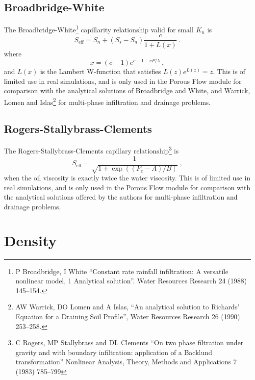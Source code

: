 \documentclass[12pt]{report}
\begin{document}
\subsection{Broadbridge-White}

The Broadbridge-White\footnote{P Broadbridge, I White ``Constant rate rainfall
infiltration: A versatile nonlinear model, 1 Analytical solution''.
Water Resources Research 24 (1988) 145--154.} capillarity relationship
valid for small $K_{n}$ is
\begin{equation}
S_{\mathrm{eff}} = S_{n} + (S_{s} - S_{n}) \frac{c}{1 + L(x)} \ .
\end{equation}
where
\begin{equation}
x = (c - 1) e^{c - 1 - c P/\lambda} \ ,
\end{equation}
and $L(x)$ is the Lambert W-function that satisfies $L(z)e^{L(z)}=z$.
This is of limited use in real simulations, and is only used in the Porous
Flow module for comparison with the analytical solutions of
Broadbridge and White, and Warrick, Lomen and Islas\footnote{AW
  Warrick, DO Lomen and A Islas, ``An analytical solution to Richards'
  Equation for a Draining Soil Profile'', Water Resources Research 26
  (1990) 253--258.} for multi-phase infiltration and drainage
problems.

\subsection{Rogers-Stallybrass-Clements}

The Rogers-Stallybrass-Clements capillary relationship\footnote{C
  Rogers, MP Stallybrass and DL Clements ``On two phase filtration
  under gravity and with boundary infiltration: application of a
  Backlund transformation'' Nonlinear Analysis, Theory, Methods and
  Applications 7 (1983) 785--799} is
\begin{equation}
S_{\mathrm{eff}} = \frac{1}{\sqrt{1 + \exp((P_{c} - A)/B)}} \ ,
\label{eqn.rsc.seff}
\end{equation}
when the oil viscosity is exactly twice the water viscosity.  This is
of limited use in real simulations, and is only used in the Porous
Flow module for comparison with the analytical solutions offered by
the authors for multi-phase infiltration and drainage problems.


\section{Density}
\end{document}
